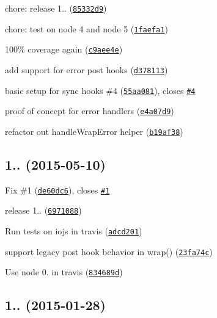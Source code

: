 \begin{DoxyItemize}
\item chore\+: release 1.. (\href{https://github.com/vkarpov15/kareem/commit/85332d9}{\tt 85332d9})
\item chore\+: test on node 4 and node 5 (\href{https://github.com/vkarpov15/kareem/commit/1faefa1}{\tt 1faefa1})
\item 100\% coverage again (\href{https://github.com/vkarpov15/kareem/commit/c9aee4e}{\tt c9aee4e})
\item add support for error post hooks (\href{https://github.com/vkarpov15/kareem/commit/d378113}{\tt d378113})
\item basic setup for sync hooks \#4 (\href{https://github.com/vkarpov15/kareem/commit/55aa081}{\tt 55aa081}), closes \href{https://github.com/vkarpov15/kareem/issues/4}{\tt \#4}
\item proof of concept for error handlers (\href{https://github.com/vkarpov15/kareem/commit/e4a07d9}{\tt e4a07d9})
\item refactor out handle\+Wrap\+Error helper (\href{https://github.com/vkarpov15/kareem/commit/b19af38}{\tt b19af38})
\end{DoxyItemize}

\label{_1.0.1}%
 \subsection*{
\footnotesize 1.. (2015-\/05-\/10)
\normalsize }


\begin{DoxyItemize}
\item Fix \#1 (\href{https://github.com/vkarpov15/kareem/commit/de60dc6}{\tt de60dc6}), closes \href{https://github.com/vkarpov15/kareem/issues/1}{\tt \#1}
\item release 1.. (\href{https://github.com/vkarpov15/kareem/commit/6971088}{\tt 6971088})
\item Run tests on iojs in travis (\href{https://github.com/vkarpov15/kareem/commit/adcd201}{\tt adcd201})
\item support legacy post hook behavior in wrap() (\href{https://github.com/vkarpov15/kareem/commit/23fa74c}{\tt 23fa74c})
\item Use node 0. in travis (\href{https://github.com/vkarpov15/kareem/commit/834689d}{\tt 834689d})
\end{DoxyItemize}

\label{_1.0.0}%
 \subsection*{1.. (2015-\/01-\/28)}


